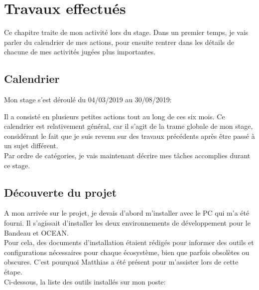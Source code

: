 \documentclass{rapport}
\begin{document}
\newpage

\section{Travaux effectués}

Ce chapitre traite de mon activité lors du stage. Dans un premier temps, je vais parler du calendrier de mes actions, pour ensuite rentrer dans les détails de chacune de mes activités jugées plus importantes.

\subsection{Calendrier}

Mon stage s'est déroulé du 04/03/2019 au 30/08/2019:\\


Il a consisté en plusieurs petites actions tout au long de ces six mois. Ce calendrier est relativement général, car il s'agit de la trame globale de mon stage, considérant le fait que je suis revenu sur des travaux précédents après être passé à un sujet différent.\\

Par ordre de catégories, je vais maintenant décrire mes tâches accomplies durant ce stage. 

\newpage
\subsection{Découverte du projet}

A mon arrivée sur le projet, je devais d'abord m'installer avec le PC qui m'a été fourni. Il s'agissait d'installer les deux environnements de développement pour le Bandeau et OCEAN.\\
Pour cela, des documents d'installation étaient rédigés pour informer des outils et configurations nécessaires pour chaque écosystème, bien que parfois obsolètes ou obscures. C'est pourquoi Matthias a été présent pour m'assister lors de cette étape.\\

Ci-dessous, la liste des outils installés sur mon poste:
\end{document}
